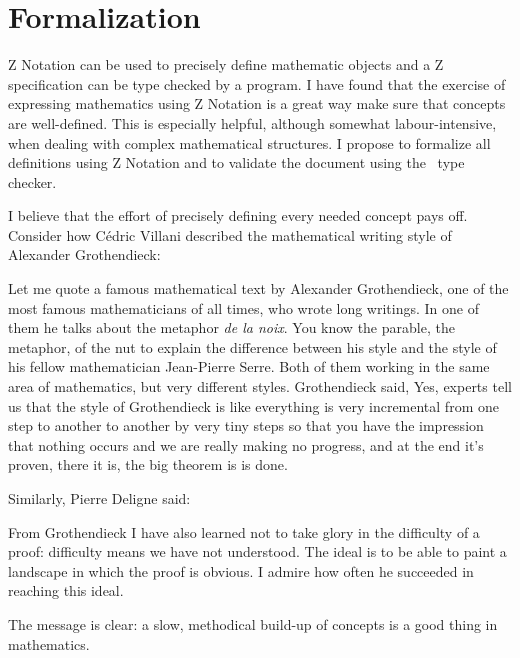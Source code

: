 \documentclass[11pt, oneside]{article}
\begin{document}
\section{Formalization}

Z Notation can be used to precisely define mathematic objects and a Z specification can be type checked by a program.
I have found that the exercise of expressing mathematics using Z Notation is a great way make sure that concepts are well-defined.
This is especially helpful, although somewhat labour-intensive, when dealing with complex mathematical structures.
I propose to formalize all definitions using Z Notation and to validate
the document using the \fuzz\ type checker.

I believe that the effort of precisely defining every needed concept pays off. 
Consider how C\'{e}dric Villani \cite{villani-hbm} described the mathematical writing style of Alexander Grothendieck:
\begin{displayquote}
Let me quote a famous mathematical text by Alexander Grothendieck, 
one of the most famous mathematicians of all times, who wrote long writings.
In one of them he talks about the metaphor \textit{de la noix}.
You know the parable, the metaphor, of the nut
to explain the difference between his style and 
the style of his fellow mathematician Jean-Pierre Serre.
Both of them working in the same area of mathematics, but very different styles. 
Grothendieck said, 
Yes, experts tell us that the style of Grothendieck is like everything is very
incremental from one step to another to
another by very tiny steps so that you
have the impression that nothing occurs
and we are really making no progress, and
at the end it's proven, there it is, the big theorem is is done.
\end{displayquote}
Similarly, Pierre Deligne  \cite{artin-ag1} said:
\begin{displayquote}
From Grothendieck I have also learned not to take glory in the difficulty of a proof: 
difficulty means we have not understood. The ideal is to be able to paint a landscape in which the proof is obvious. 
I admire how often he succeeded in reaching this ideal.
\end{displayquote}
The message is clear: a slow, methodical build-up of concepts is a good thing in mathematics.
\end{document}
